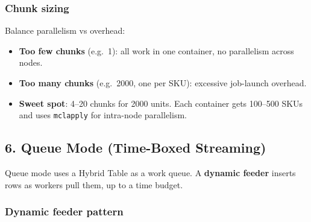 \documentclass[
]{article}
\newenvironment{Shaded}{\begin{snugshade}}{\end{snugshade}}
\newcommand{\AttributeTok}[1]{\textcolor[rgb]{0.13,0.29,0.53}{#1}}
\newcommand{\CommentTok}[1]{\textcolor[rgb]{0.56,0.35,0.01}{\textit{#1}}}
\newcommand{\ConstantTok}[1]{\textcolor[rgb]{0.56,0.35,0.01}{#1}}
\newcommand{\DataTypeTok}[1]{\textcolor[rgb]{0.13,0.29,0.53}{#1}}
\newcommand{\DecValTok}[1]{\textcolor[rgb]{0.00,0.00,0.81}{#1}}
\newcommand{\FunctionTok}[1]{\textcolor[rgb]{0.13,0.29,0.53}{\textbf{#1}}}
\newcommand{\NormalTok}[1]{#1}
\newcommand{\OtherTok}[1]{\textcolor[rgb]{0.56,0.35,0.01}{#1}}
\newcommand{\SpecialCharTok}[1]{\textcolor[rgb]{0.81,0.36,0.00}{\textbf{#1}}}
\providecommand{\tightlist}{%
  \setlength{\itemsep}{0pt}\setlength{\parskip}{0pt}}
\begin{document}
\subsubsection{Chunk sizing}\label{chunk-sizing}

Balance parallelism vs overhead:

\begin{itemize}
\tightlist
\item
  \textbf{Too few chunks} (e.g.~1): all work in one container, no
  parallelism across nodes.
\item
  \textbf{Too many chunks} (e.g.~2000, one per SKU): excessive
  job-launch overhead.
\item
  \textbf{Sweet spot}: 4--20 chunks for 2000 units. Each container gets
  100--500 SKUs and uses \texttt{mclapply} for intra-node parallelism.
\end{itemize}

\subsection{6. Queue Mode (Time-Boxed
Streaming)}\label{queue-mode-time-boxed-streaming}

Queue mode uses a Hybrid Table as a work queue. A \textbf{dynamic
feeder} inserts rows as workers pull them, up to a time budget.

\begin{Shaded}
\end{Shaded}

\subsubsection{Dynamic feeder pattern}\label{dynamic-feeder-pattern}
\end{document}
